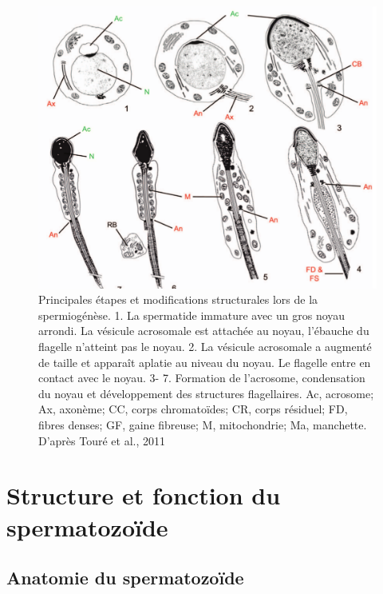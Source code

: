 \documentclass[12pt,twoside]{reedthesis}
\theoremstyle{definition}
\theoremstyle{definition}
\theoremstyle{remark}
\begin{document}
  \begin{figure}
  
  {\centering \includegraphics[scale=0.3]{figure/spermiogenese} 
  
  }
  
  \caption{Principales étapes et modifications structurales lors de la spermiogénèse.
  1. La spermatide immature avec un gros noyau arrondi. La vésicule acrosomale est attachée
  au noyau, l’ébauche du flagelle n’atteint pas le noyau. 2. La vésicule acrosomale a augmenté
  de taille et apparaît aplatie au niveau du noyau. Le flagelle entre en contact avec le noyau. 3-
  7. Formation de l’acrosome, condensation du noyau et développement des structures
  flagellaires. Ac, acrosome; Ax, axonème; CC, corps chromatoïdes; CR, corps résiduel; FD,
  fibres denses; GF, gaine fibreuse; M, mitochondrie; Ma, manchette. D’après Touré et al.,
  2011}\label{fig:spermiogénese}
  \end{figure}
  
  \section{Structure et fonction du
  spermatozoïde}\label{structure-et-fonction-du-spermatozoide}
  
  \subsection{Anatomie du spermatozoïde}\label{anatomie-du-spermatozoide}
  
\end{document}
